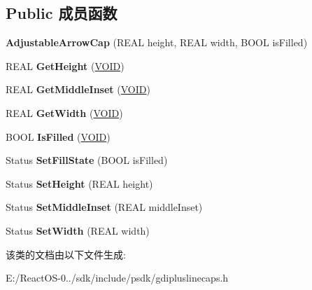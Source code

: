 \subsection*{Public 成员函数}
\begin{DoxyCompactItemize}
\item 
\mbox{\label{class_adjustable_arrow_cap_a2811f5f348504dc33ebd22de8554fd17}} 
{\bfseries Adjustable\+Arrow\+Cap} (R\+E\+AL height, R\+E\+AL width, B\+O\+OL is\+Filled)
\item 
\mbox{\label{class_adjustable_arrow_cap_a622889f7f58f1b9822f19295d9e640ca}} 
R\+E\+AL {\bfseries Get\+Height} (\hyperlink{interfacevoid}{V\+O\+ID})
\item 
\mbox{\label{class_adjustable_arrow_cap_a062652ca65dc175d1d1e825e3c01cd78}} 
R\+E\+AL {\bfseries Get\+Middle\+Inset} (\hyperlink{interfacevoid}{V\+O\+ID})
\item 
\mbox{\label{class_adjustable_arrow_cap_ad508e88b9e8415e952667fa74524e525}} 
R\+E\+AL {\bfseries Get\+Width} (\hyperlink{interfacevoid}{V\+O\+ID})
\item 
\mbox{\label{class_adjustable_arrow_cap_a763970239c7515e64d1f5a8e856faa2b}} 
B\+O\+OL {\bfseries Is\+Filled} (\hyperlink{interfacevoid}{V\+O\+ID})
\item 
\mbox{\label{class_adjustable_arrow_cap_a9d6bac51f878bc3e812ab270d11ea4cc}} 
Status {\bfseries Set\+Fill\+State} (B\+O\+OL is\+Filled)
\item 
\mbox{\label{class_adjustable_arrow_cap_a4aa2db9d2a14300916677c02acf66d0a}} 
Status {\bfseries Set\+Height} (R\+E\+AL height)
\item 
\mbox{\label{class_adjustable_arrow_cap_a0597a1dbc0efe1403a9688df317a9e39}} 
Status {\bfseries Set\+Middle\+Inset} (R\+E\+AL middle\+Inset)
\item 
\mbox{\label{class_adjustable_arrow_cap_a6cc2b467733a7839267f16b0078c9905}} 
Status {\bfseries Set\+Width} (R\+E\+AL width)
\end{DoxyCompactItemize}


该类的文档由以下文件生成\+:\begin{DoxyCompactItemize}
\item 
E\+:/\+React\+O\+S-\/0../sdk/include/psdk/gdipluslinecaps.\+h\end{DoxyCompactItemize}
